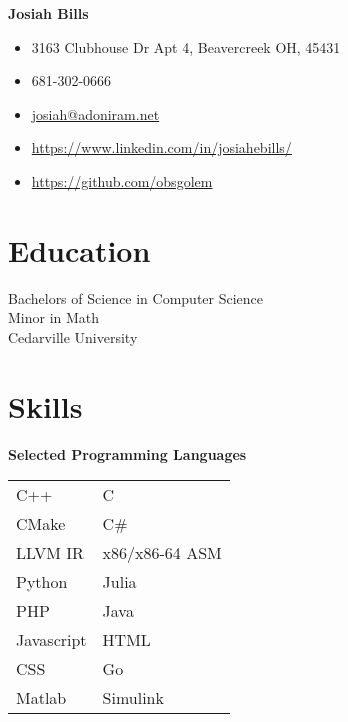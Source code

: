 \documentclass[10pt]{article}
\begin{document}
    \begin{paracol}{2}
        \parbox[top][0.08\textheight][c]{\linewidth}{
            \textbf{\Huge{Josiah Bills}}
        }
        
        \switchcolumn
        
        \parbox[top][0.08\textheight][c]{\linewidth}{
            \begin{mdframed}[hidealllines=true,backgroundcolor=gray!20]
                \begin{itemize}[noitemsep]
                    \item[] 3163 Clubhouse Dr Apt 4, Beavercreek OH, 45431
                    \item[] 681-302-0666
                    \item[] \href{mailto://Josiah@adoniram.net}{josiah@adoniram.net}
                    \item[] \url{https://www.linkedin.com/in/josiahebills/}
                    \item[] \url{https://github.com/obsgolem}
                \end{itemize}
            \end{mdframed}
        }
        
        \switchcolumn

        \section*{Education}
        \parbox[top][][c]{\linewidth}{
            Bachelors of Science in Computer Science \\
            Minor in Math \\
            Cedarville University 
        }
        
        \section*{Skills}

        \parbox[top][][c]{\linewidth}{
            \begin{center}
                \textbf{Selected Programming Languages}
            \end{center}
            \begin{tabularx}{\linewidth}{YY}
                C++ & C \\
                CMake & C\# \\
                LLVM IR & x86/x86-64 ASM \\
                Python & Julia \\
                PHP & Java \\
                Javascript & HTML \\
                CSS & Go \\
                Matlab & Simulink
            \end{tabularx}
            
}
\end{paracol}
\end{document}
